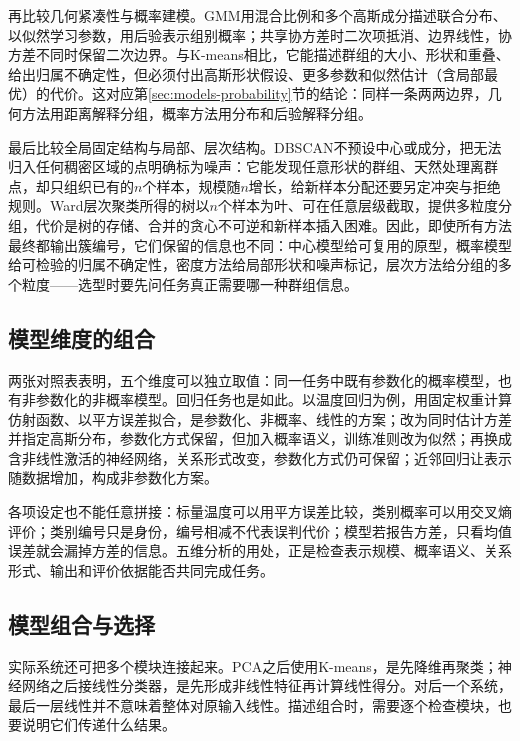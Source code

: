 再比较几何紧凑性与概率建模。GMM用混合比例和多个高斯成分描述联合分布、以似然学习参数，用后验表示组别概率；共享协方差时二次项抵消、边界线性，协方差不同时保留二次边界。与K-means相比，它能描述群组的大小、形状和重叠、给出归属不确定性，但必须付出高斯形状假设、更多参数和似然估计（含局部最优）的代价。这对应第\ref{sec:models-probability}节的结论：同样一条两两边界，几何方法用距离解释分组，概率方法用分布和后验解释分组。

最后比较全局固定结构与局部、层次结构。DBSCAN不预设中心或成分，把无法归入任何稠密区域的点明确标为噪声：它能发现任意形状的群组、天然处理离群点，却只组织已有的$n$个样本，规模随$n$增长，给新样本分配还要另定冲突与拒绝规则。Ward层次聚类所得的树以$n$个样本为叶、可在任意层级截取，提供多粒度分组，代价是树的存储、合并的贪心不可逆和新样本插入困难。因此，即使所有方法最终都输出簇编号，它们保留的信息也不同：中心模型给可复用的原型，概率模型给可检验的归属不确定性，密度方法给局部形状和噪声标记，层次方法给分组的多个粒度——选型时要先问任务真正需要哪一种群组信息。

\subsection{模型维度的组合}
\label{sec:models-dimension-combination}

两张对照表表明，五个维度可以独立取值：同一任务中既有参数化的概率模型，也有非参数化的非概率模型。回归任务也是如此。以温度回归为例，用固定权重计算仿射函数、以平方误差拟合，是参数化、非概率、线性的方案；改为同时估计方差并指定高斯分布，参数化方式保留，但加入概率语义，训练准则改为似然；再换成含非线性激活的神经网络，关系形式改变，参数化方式仍可保留；近邻回归让表示随数据增加，构成非参数化方案。

各项设定也不能任意拼接：标量温度可以用平方误差比较，类别概率可以用交叉熵评价；类别编号只是身份，编号相减不代表误判代价；模型若报告方差，只看均值误差就会漏掉方差的信息。五维分析的用处，正是检查表示规模、概率语义、关系形式、输出和评价依据能否共同完成任务。

\subsection{模型组合与选择}
\label{sec:models-combination-selection}

实际系统还可把多个模块连接起来。PCA之后使用K-means，是先降维再聚类；神经网络之后接线性分类器，是先形成非线性特征再计算线性得分。对后一个系统，最后一层线性并不意味着整体对原输入线性。描述组合时，需要逐个检查模块，也要说明它们传递什么结果。

